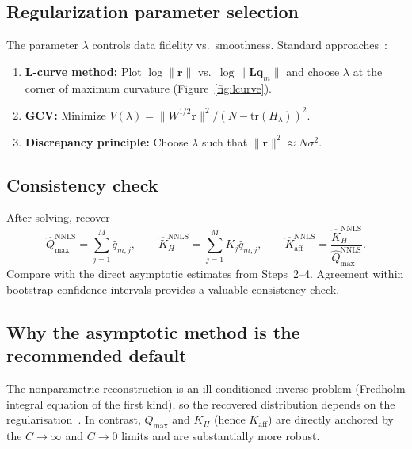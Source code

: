 \documentclass[12pt]{article}
\begin{document}
\subsection{Regularization parameter selection}

The parameter $\lambda$ controls data fidelity vs.\ smoothness.
Standard approaches~\cite{Hansen1992}:
\begin{enumerate}[nosep]
  \item \textbf{L-curve method:} Plot $\log\|\bm{r}\|$ vs.\
        $\log\|\bm{L}\bm{q}_m\|$ and choose $\lambda$ at the corner
        of maximum curvature (Figure~\ref{fig:lcurve}).
  \item \textbf{GCV:} Minimize
        $V(\lambda)=\|W^{1/2}\bm{r}\|^2/(N-\mathrm{tr}(H_\lambda))^2$.
  \item \textbf{Discrepancy principle:} Choose $\lambda$ such that
        $\|\bm{r}\|^2\approx N\sigma^2$.
\end{enumerate}

\subsection{Consistency check}

After solving, recover
\begin{equation}
  \widehat{Q}_{\max}^{\mathrm{NNLS}} = \sum_{j=1}^{M}\widehat{q}_{m,j},
  \qquad
  \widehat{K}_H^{\mathrm{NNLS}} = \sum_{j=1}^{M} K_j\widehat{q}_{m,j},
  \qquad
  \widehat{K}_{\mathrm{aff}}^{\mathrm{NNLS}}
    = \frac{\widehat{K}_H^{\mathrm{NNLS}}}{\widehat{Q}_{\max}^{\mathrm{NNLS}}}.
\end{equation}
Compare with the direct asymptotic estimates from Steps~2--4.
Agreement within bootstrap confidence intervals provides a valuable
consistency check.

\subsection{Why the asymptotic method is the recommended default}

The nonparametric reconstruction is an ill-conditioned inverse problem
(Fredholm integral equation of the first kind), so the recovered
distribution depends on the regularisation~\cite{Hansen1998}.  In
contrast, $Q_{\max}$ and $K_H$ (hence $K_{\mathrm{aff}}$) are
directly anchored by the $C\to\infty$ and $C\to 0$ limits and are
substantially more robust.

\end{document}
